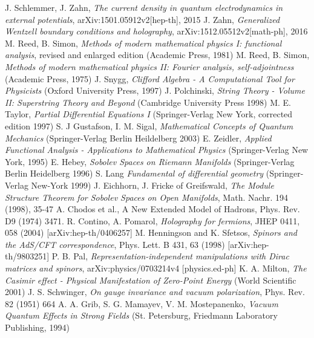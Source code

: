 \documentclass[11pt, oneside]{report}   	%
\title{}
\author{}
\theoremstyle{remark}
\begin{document}

%



\begin{thebibliography}{9}
 J. Schlemmer, J. Zahn, \textit{The current density in quantum electrodynamics in external potentials}, arXiv:1501.05912v2[hep-th], 2015
 J. Zahn, \textit{Generalized Wentzell boundary conditions and holography}, arXiv:1512.05512v2[math-ph], 2016
 M. Reed, B. Simon, \textit{Methods of modern mathematical physics I: functional analysis}, revised and enlarged edition (Academic Press, 1981)
 M. Reed, B. Simon, \textit{Methods of modern mathematical physics II: Fourier analysis, self-adjointness} (Academic Press, 1975)
 J. Snygg, \textit{Clifford Algebra - A Computational Tool for Physicists} (Oxford University Press, 1997)
 J. Polchinski, \textit{String Theory - Volume II: Superstring Theory and Beyond} (Cambridge University Press 1998)
 M. E. Taylor, \textit{Partial Differential Equations I} (Springer-Verlag New York, corrected edition 1997)
 S. J Gustafson, I. M. Sigal, \textit{Mathematical Concepts of Quantum Mechanics} (Springer-Verlag Berlin Heildelberg 2003)
 E. Zeidler, \textit{Applied Functional Analysis - Applications to Mathematical Physics} (Springer-Verlag New York, 1995)
 E. Hebey, \textit{Sobolev Spaces on Riemann Manifolds} (Springer-Verlag Berlin Heidelberg 1996)
 S. Lang \textit{Fundamental of differential geometry} (Springer-Verlag New-York 1999)
 J. Eichhorn, J. Fricke of Greifswald, \textit{The Module Structure Theorem for Sobolev Spaces on Open Manifolds}, Math. Nachr. 194 (1998), 35-47 
 A. Chodos et al., A New Extended Model of Hadrons, Phys. Rev. D9 (1974) 3471.
 R. Contino, A. Pomarol, \textit{Holography for fermions}, JHEP 0411, 058 (2004) [arXiv:hep-th/0406257]
 M. Henningson and K. Sfetsos, \textit{Spinors and the AdS/CFT correspondence}, Phys. Lett. B 431, 63 (1998) [arXiv:hep-th/9803251]
 P. B. Pal, \textit{Representation-independent manipulations with Dirac matrices and spinors}, arXiv:physics/0703214v4 [physics.ed-ph]
 K. A. Milton, \textit{The Casimir effect - Physical Manifestation of Zero-Point Energy} (World Scientific 2001)
 J. S. Schwinger, \textit{On gauge invariance and vacuum polarization}, Phys. Rev. 82 (1951) 664
 A. A. Grib, S. G. Mamayev, V. M. Mostepanenko, \textit{Vacuum Quantum Effects in Strong Fields} (St. Petersburg, Friedmann Laboratory Publishing, 1994)\end{thebibliography}
\end{document}
